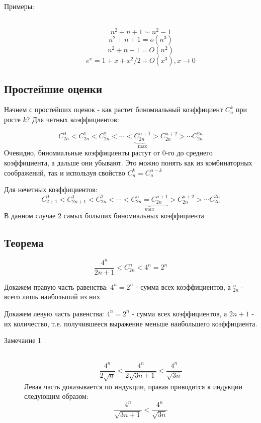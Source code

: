 \begin{description}
\item[Примеры:] ~
$$
n^2 + n + 1 \sim n^2 - 1
$$
$$
n^2 + n + 1 = o(n^3)
$$
$$
n^2 + n + 1 = O(n^2)
$$
$$
e^x = 1 + x + x^2/2 + O(x^3),  x \to 0
$$

\end{description}


\subsection{Простейшие оценки}

Начнем с простейших оценок - как растет биномиальный коэффициент $ C_{n}^{k} $ при росте $ k $?
Для четных коэффициентов:

$$
C_{2n}^{0} < C_{2n}^{1} < C_{2n}^{2} < \cdots < \underbrace{C_{2n}^{n+1}}_{\max}  > C_{2n}^{n+2} > \cdots C_{2n}^{2n}
$$
Очевидно, биномиальные коэффициенты растут от 0-го до среднего коэффициента, а дальше они убывают.
Это можно понять как из комбинаторных соображений, так и используя свойство $ C_{n}^{k} = C_{n}^{n-k} $

Для нечетных коэффициентов:
$$
C_{2+1}^{0} < C_{2n+1}^{1} < C_{2n}^{2} < \cdots < \underbrace{C_{2n}^{n} = C_{2n}^{n+1}}_{max}  > C_{2n}^{n+2} > \cdots C_{2n}^{2n}
$$
В данном случае 2 самых больших биномиальных коэффициента

\subsection{Теорема}
\begin{equation}
\label{binomial1}
\frac{4^n}{2n+1} < C_{2n}^{n} < 4^n = 2^n
\end{equation}

Докажем правую часть равенства:
$4^n = 2^n$ - сумма всех коэффициентов, а $ _{2n}^{n} $ - всего лишь наибольший из них


Докажем левую часть равенства:
$4^n = 2^n$ - сумма всех коэффициентов, а $ 2n + 1 $ - их количество, т.е. получившееся выражение меньше наибольшего коэффициента.


\begin{description}
\item[Замечание 1] ~
$$
\frac{4^n}{2\sqrt{n}} < \frac{4^n}{2\sqrt{3n+1}} < \frac{4^n}{\sqrt{3n}}
$$
Левая часть доказывается по индукции, правая приводится к индукции следующим образом:
$$ 
\frac{4^n}{\sqrt{3n+1}} < \frac{4^n}{\sqrt{3n}}
$$
\end{description}



